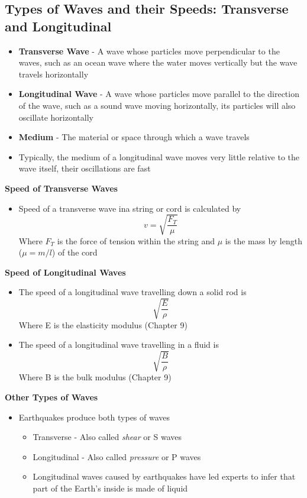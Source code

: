 \subsection{Types of Waves and their Speeds: Transverse and Longitudinal}
\begin{itemize}
    \item \textbf{Transverse Wave} - A wave whose particles move perpendicular to the waves, such as an ocean wave where the water moves vertically but the wave travels horizontally
    \item \textbf{Longitudinal Wave} - A wave whose particles move parallel to the direction of the wave, such as a sound wave moving horizontally, its particles will also oscillate horizontally
    \item \textbf{Medium} - The material or space through which a wave travels
    \item Typically, the medium of a longitudinal wave moves very little relative to the wave itself, their oscillations are fast
\end{itemize}

\textbf{Speed of Transverse Waves}
\begin{itemize}
    \item Speed of a transverse wave ina string or cord is calculated by \[v=\sqrt{\frac{F_T}{\mu}}\] Where \(F_T\) is the force of tension within the string and \(\mu\) is the mass by length (\(\mu=m/l\)) of the cord
\end{itemize}

\textbf{Speed of Longitudinal Waves}
\begin{itemize}
    \item The speed of a longitudinal wave travelling down a solid rod is \[\sqrt{\frac{E}{\rho}}\] Where E is the elasticity modulus (Chapter 9) 
    \item The speed of a longitudinal wave travelling in a fluid is \[\sqrt{\frac{B}{\rho}}\] Where B is the bulk modulus (Chapter 9)
\end{itemize}

\textbf{Other Types of Waves}
\begin{itemize}
    \item Earthquakes produce both types of waves
\begin{itemize}
    \item Transverse - Also called \emph{shear} or S waves
    \item Longitudinal - Also called \emph{pressure} or P waves
    \item Longitudinal waves caused by earthquakes have led experts to infer that part of the Earth's inside is made of liquid
\end{itemize}
\end{itemize}

